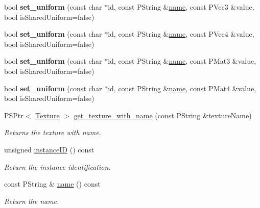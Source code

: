 \begin{DoxyCompactItemize}
bool {\bfseries set\+\_\+uniform} (const char $\ast$id, const P\+String \&\mbox{\hyperlink{classprz_1_1_material_ab1b2f9074aea77954b1ad70b72f48c3a}{name}}, const P\+Vec3 \&value, bool is\+Shared\+Uniform=false)
\item 
\mbox{\label{classprz_1_1_material_acb1e095a79c9fb64a2dfcd2680454d4b}} 
bool {\bfseries set\+\_\+uniform} (const char $\ast$id, const P\+String \&\mbox{\hyperlink{classprz_1_1_material_ab1b2f9074aea77954b1ad70b72f48c3a}{name}}, const P\+Vec4 \&value, bool is\+Shared\+Uniform=false)
\item 
\mbox{\label{classprz_1_1_material_a816d657f74c72b799f0f5c72ecc0042a}} 
bool {\bfseries set\+\_\+uniform} (const char $\ast$id, const P\+String \&\mbox{\hyperlink{classprz_1_1_material_ab1b2f9074aea77954b1ad70b72f48c3a}{name}}, const P\+Mat3 \&value, bool is\+Shared\+Uniform=false)
\item 
\mbox{\label{classprz_1_1_material_a7e872d76e0bdbfe68a1c14ab649a8b83}} 
bool {\bfseries set\+\_\+uniform} (const char $\ast$id, const P\+String \&\mbox{\hyperlink{classprz_1_1_material_ab1b2f9074aea77954b1ad70b72f48c3a}{name}}, const P\+Mat4 \&value, bool is\+Shared\+Uniform=false)
\item 
P\+S\+Ptr$<$ \mbox{\hyperlink{classprz_1_1_texture}{Texture}} $>$ \mbox{\hyperlink{classprz_1_1_material_a2e6d6a6b47a8f79bc07191fdd2a5ed98}{get\+\_\+texture\+\_\+with\+\_\+name}} (const P\+String \&texture\+Name)
\begin{DoxyCompactList}\small\item\em Returns the texture with name. \end{DoxyCompactList}\item 
unsigned \mbox{\hyperlink{classprz_1_1_material_ab65ef8e87a39279c67fa334ac044d1c8}{instance\+ID}} () const
\begin{DoxyCompactList}\small\item\em Return the instance identification. \end{DoxyCompactList}\item 
const P\+String \& \mbox{\hyperlink{classprz_1_1_material_ab1b2f9074aea77954b1ad70b72f48c3a}{name}} () const
\begin{DoxyCompactList}\small\item\em Return the name. \end{DoxyCompactList}\item 

\end{DoxyCompactItemize}
